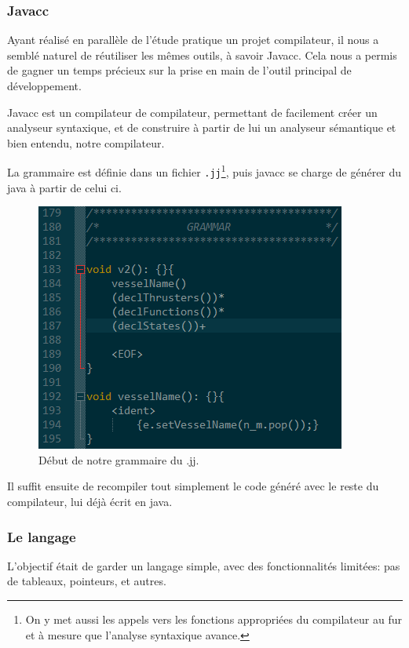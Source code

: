 \documentclass[a4paper,11pt]{article}
\begin{document}
    \subsubsection{Javacc}
        Ayant réalisé en parallèle de l'étude pratique un projet compilateur, il nous a semblé naturel de réutiliser les mêmes outils, à savoir Javacc. Cela nous a permis de gagner un temps précieux sur la prise en main de l'outil principal de développement.

        Javacc est un compilateur de compilateur, permettant de facilement créer un analyseur syntaxique, et de construire à partir de lui un analyseur sémantique et bien entendu, notre compilateur.
        
        La grammaire est définie dans un fichier \verb|.jj|\footnote{On y met aussi les appels vers les fonctions appropriées du compilateur au fur et à mesure que l'analyse syntaxique avance.}, puis javacc se charge de générer du java à partir de celui ci.
        
        \begin{figure}[!h]
            \begin{center}
                \includegraphics{img/grammar_jj.png}
                \caption{Début de notre grammaire du .jj.}
            \end{center}
        \end{figure}
        
        Il suffit ensuite de recompiler tout simplement le code généré avec le reste du compilateur, lui déjà écrit en java.

    \subsubsection{Le langage}
        L'objectif était de garder un langage simple, avec des fonctionnalités limitées: pas de tableaux, pointeurs, et autres.
\end{document}

